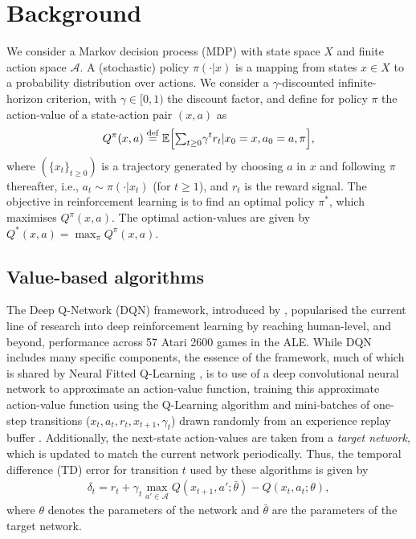 \documentclass{article}
\newcommand{\beqa}{\begin{eqnarray}}
\newcommand{\eeqa}{\end{eqnarray}}
\newcommand{\E}{{\mathbb E}}
\newcommand{\eqdef}{\stackrel{\rm def}{=}}
\begin{document}
\section{Background}
We consider a Markov decision process (MDP) with state space $X$ and finite 
action space $\mathcal{A}$. 
A (stochastic) policy $\pi(\cdot | x)$ is a mapping from states $x \in X$ to a 
probability distribution over 
actions. We consider a $\gamma$-discounted infinite-horizon criterion, with 
$\gamma \in [0, 1)$ the discount factor, and define for policy $\pi$ the action-value of 
a state-action pair $(x,a)$ as 
$$Q^{\pi}(x,a) \eqdef \E\Big[ {\textstyle \sum_{t\geq 0} } \gamma^t r_t | x_0=x, a_0=a, \pi\Big],$$
where $(\{x_t\}_{t\geq 0})$ is a trajectory generated by choosing $a$ in $x$ 
and following $\pi$ thereafter, i.e., $a_t\sim \pi(\cdot|x_t)$ (for $t\geq 1$), 
and $r_t$ is the reward signal. The objective in reinforcement learning 
is to find an optimal policy $\pi^*$, which maximises $Q^{\pi}(x,a)$. 
The optimal action-values are given by $Q^*(x,a)=\max_{\pi} Q^{\pi}(x,a)$. 



\subsection{Value-based algorithms}

The Deep Q-Network (DQN) framework, introduced by \citet{mnih15human}, 
popularised the current line of research into deep reinforcement learning by reaching 
human-level, and beyond, performance across 57 Atari 2600 games in the ALE. 
While DQN includes many specific components, the essence of the framework, much 
of which is shared by Neural Fitted Q-Learning \citep{riedmiller2005neural}, is 
to use of a deep convolutional neural network to approximate an action-value 
function, training this approximate action-value function using the 
Q-Learning algorithm \citep{watkins1992} and mini-batches of one-step 
transitions ($x_t, a_t, r_t, x_{t+1}, \gamma_t$) drawn randomly from an 
experience replay buffer \citep{lin1992self}. Additionally, the next-state 
action-values are taken from a \textit{target network}, which is updated to 
match the current network periodically. Thus, the temporal difference (TD) error 
for transition $t$ used by these algorithms is given by
\beqa\label{eq:tderr}
\delta_t = r_t + \gamma_t \max_{a' \in \mathcal{A}} Q(x_{t+1}, a'; \bar \theta) - Q(x_t, 
a_t; \theta),
\eeqa
where $\theta$ denotes the parameters of the network and $\bar \theta$ are the 
parameters of the target network.
\end{document}
